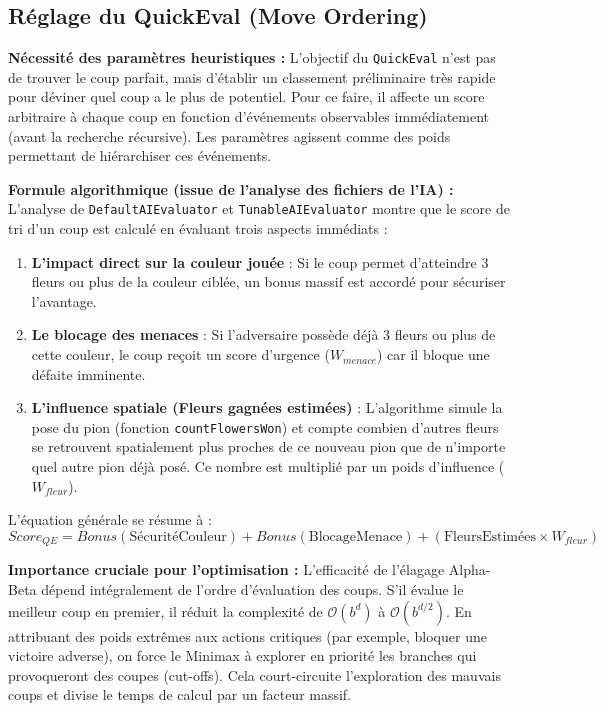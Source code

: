\documentclass[12pt, a4paper]{article}
\begin{document}
\subsection{R\'eglage du QuickEval (Move Ordering)}

\textbf{N\'ecessit\'e des param\`etres heuristiques :}
L'objectif du \texttt{QuickEval} n'est pas de trouver le coup parfait, mais d'\'etablir un classement pr\'eliminaire tr\`es rapide pour d\'eviner quel coup a le plus de potentiel. Pour ce faire, il affecte un score arbitraire \`a chaque coup en fonction d'\'ev\'enements observables imm\'ediatement (avant la recherche r\'ecursive). Les param\`etres agissent comme des poids permettant de hi\'erarchiser ces \'ev\'enements.

\textbf{Formule algorithmique (issue de l'analyse des fichiers de l'IA) :}
L'analyse de \texttt{DefaultAIEvaluator} et \texttt{TunableAIEvaluator} montre que le score de tri d'un coup est calcul\'e en \'evaluant trois aspects imm\'ediats :
\begin{enumerate}
    \item \textbf{L'impact direct sur la couleur jou\'ee} : Si le coup permet d'atteindre 3 fleurs ou plus de la couleur cibl\'ee, un bonus massif est accord\'e pour s\'ecuriser l'avantage.
    \item \textbf{Le blocage des menaces} : Si l'adversaire poss\`ede d\'ej\`a 3 fleurs ou plus de cette couleur, le coup re\c{c}oit un score d'urgence ($W_{menace}$) car il bloque une d\'efaite imminente.
    \item \textbf{L'influence spatiale (Fleurs gagn\'ees estim\'ees)} : L'algorithme simule la pose du pion (fonction \texttt{countFlowersWon}) et compte combien d'autres fleurs se retrouvent spatialement plus proches de ce nouveau pion que de n'importe quel autre pion d\'ej\`a pos\'e. Ce nombre est multipli\'e par un poids d'influence ($W_{fleur}$).
\end{enumerate}

L'\'equation g\'en\'erale se r\'esume \`a :
\begin{equation}
Score_{QE} = Bonus(\text{S\'ecurit\'eCouleur}) + Bonus(\text{BlocageMenace}) + (\text{FleursEstim\'ees} \times W_{fleur})
\end{equation}

\textbf{Importance cruciale pour l'optimisation :}
L'efficacit\'e de l'\'elagage Alpha-Beta d\'epend int\'egralement de l'ordre d'\'evaluation des coups. S'il \'evalue le meilleur coup en premier, il r\'eduit la complexit\'e de $\mathcal{O}(b^d)$ \`a $\mathcal{O}(b^{d/2})$. En attribuant des poids extr\^emes aux actions critiques (par exemple, bloquer une victoire adverse), on force le Minimax \`a explorer en priorit\'e les branches qui provoqueront des coupes (cut-offs). Cela court-circuite l'exploration des mauvais coups et divise le temps de calcul par un facteur massif.
\end{document}
